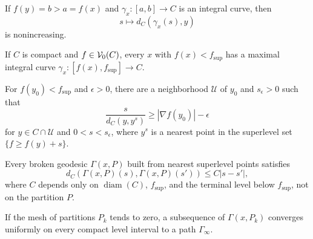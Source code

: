 \begin{lemma}
\label{lem:chow-iii-h52-integral-curve-to-point-distance}
If $f(y)=b>a=f(x)$ and $\gamma_x:[a,b]\to C$ is an integral curve, then
\[
s\longmapsto d_C(\gamma_x(s),y)
\]
is nonincreasing.
\end{lemma}

\begin{proposition}
\label{prop:chow-iii-h53-maximal-integral-curve}
If $C$ is compact and $f\in\mathcal V_0(C)$, every $x$ with $f(x)<f_{\sup}$ has a maximal
integral curve $\gamma_x:[f(x),f_{\sup}]\to C$.
\end{proposition}

\begin{lemma}
\label{lem:chow-iii-h54-distance-superlevel}
For $f(y_0)<f_{\sup}$ and $\epsilon>0$, there are a neighborhood $\mathcal U$ of
$y_0$ and $s_\epsilon>0$ such that
\[
\frac{s}{d_C(y,y^s)}\ge |\nabla f(y_0)|-\epsilon
\]
for $y\in C\cap\mathcal U$ and $0<s<s_\epsilon$, where $y^s$ is a nearest point in
the superlevel set $\{f\ge f(y)+s\}$.
\end{lemma}

\begin{lemma}
\label{lem:chow-iii-h55-broken-geodesic-bound}
Every broken geodesic $\Gamma(x,P)$ built from nearest superlevel points satisfies
\[
d_C(\Gamma(x,P)(s),\Gamma(x,P)(s'))\le C|s-s'|,
\]
where $C$ depends only on $\operatorname{diam}(C)$, $f_{\sup}$, and the terminal level
below $f_{\sup}$, not on the partition $P$.
\end{lemma}

\begin{corollary}
\label{cor:chow-iii-h56-broken-geodesic-limit}
If the mesh of partitions $P_k$ tends to zero, a subsequence of $\Gamma(x,P_k)$
converges uniformly on every compact level interval to a path $\Gamma_\infty$.
\end{corollary}

